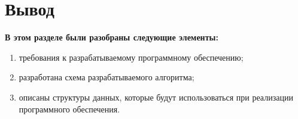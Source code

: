 \section*{Вывод}
\textbf{В этом разделе были разобраны следующие элементы:}
\begin{enumerate}
	\item требования к разрабатываемому программному обеспечению;
	\item разработана схема разрабатываемого алгоритма;
	\item описаны структуры данных, которые будут использоваться при реализации  программного обеспечения.
\end{enumerate}



